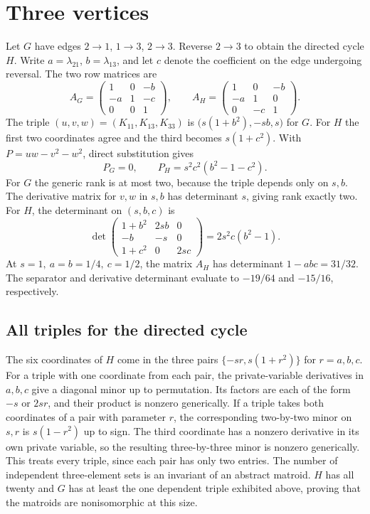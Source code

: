 \documentclass[11pt,a4paper]{amsart}
\begin{document}
\section{Three vertices}

Let \(G\) have edges \(2\to1\), \(1\to3\), \(2\to3\). Reverse \(2\to3\)
to obtain the directed cycle \(H\). Write \(a=\lambda_{21}\),
\(b=\lambda_{13}\), and let \(c\) denote the coefficient on the
edge undergoing reversal. The two row matrices are
\[
 A_G=\begin{pmatrix}1&0&-b\\-a&1&-c\\0&0&1\end{pmatrix},
 \qquad
 A_H=\begin{pmatrix}1&0&-b\\-a&1&0\\0&-c&1\end{pmatrix}.
\]
The triple \((u,v,w)=(K_{11},K_{13},K_{33})\) is
\(\bigl(s(1+b^2),-sb,s\bigr)\) for \(G\). For \(H\) the first two
coordinates agree and the third becomes \(s(1+c^2)\).
With \(P=uw-v^2-w^2\), direct substitution gives
\[
 P_G=0,\qquad P_H=s^2c^2(b^2-1-c^2).
\]
For \(G\) the generic rank is at most two, because the triple depends
only on \(s,b\). The derivative matrix for \(v,w\) in \(s,b\) has
determinant \(s\), giving rank exactly two. For \(H\), the determinant
on \((s,b,c)\) is
\[
 \det\begin{pmatrix}
 1+b^2 & 2sb & 0\\[-1pt]
 -b & -s & 0\\[-1pt]
 1+c^2 & 0 & 2sc
 \end{pmatrix}
 = 2s^2 c(b^2-1).
\]
At \(s=1,\ a=b=1/4,\ c=1/2\), the matrix \(A_H\) has determinant
\(1-abc=31/32\). The separator and derivative determinant evaluate
to \(-19/64\) and \(-15/16\), respectively.

\subsection{All triples for the directed cycle}

The six coordinates of \(H\) come in the three pairs
\(\{-sr,s(1+r^2)\}\) for \(r=a,b,c\).
For a triple with one coordinate from each pair, the private-variable
derivatives in \(a,b,c\) give a diagonal minor up to permutation.
Its factors are each of the form \(-s\) or \(2sr\), and their product
is nonzero generically. If a triple takes both coordinates of a pair
with parameter \(r\), the corresponding two-by-two minor on \(s,r\)
is \(s(1-r^2)\) up to sign. The third coordinate has a nonzero
derivative in its own private variable, so the resulting three-by-three
minor is nonzero generically. This treats every triple, since each pair
has only two entries. The number of independent three-element sets
is an invariant of an abstract matroid. \(H\) has all twenty and \(G\)
has at least the one dependent triple exhibited above, proving that
the matroids are nonisomorphic at this size.
\end{document}
